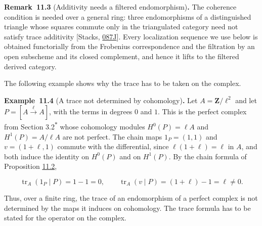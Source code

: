 \documentclass[11pt]{article}
\newenvironment{bpstatement}[2]{\par\addvspace{0.6\baselineskip}\noindent\textbf{#1}#2\textbf{.}\enspace\ignorespaces}
  {\par\addvspace{0.4\baselineskip}}
\newcommand{\bpout}[1]{#1\textsuperscript{\hyperlink{bp-outside}{\ensuremath{\ast}}}}
\begin{document}
\label{bp10}%
\begin{bpstatement}{Remark~11.3}{ (Additivity needs a filtered endomorphism)}
The coherence condition is needed over a general ring: three endomorphisms of a distinguished triangle whose squares commute only in the triangulated category need not satisfy trace additivity [Stacks, \href{https://stacks.math.columbia.edu/tag/087J}{087J}]. Every localization sequence we use below is obtained functorially from the Frobenius correspondence and the filtration by an open subscheme and its closed complement, and hence it lifts to the filtered derived category.
\end{bpstatement}

\label{bp11}%
The following example shows why the trace has to be taken on the complex.

\label{bp12}%
\begin{bpstatement}{Example~11.4}{ (A trace not determined by cohomology)}
Let \(A=\mathbf Z/\ell^2\) and let \(P=[A\xrightarrow{\ell}A]\), with the terms in degrees \(0\) and \(1\). This is the perfect complex from Section \bpout{3.2} whose cohomology modules \(H^0(P)=\ell A\) and \(H^1(P)=A/\ell A\) are not perfect. The chain maps \(1_P=(1,1)\) and \(v=(1+\ell,1)\) commute with the differential, since \(\ell(1+\ell)=\ell\) in \(A\), and both induce the identity on \(H^0(P)\) and on \(H^1(P)\). By the chain formula of Proposition \hyperref[bp7]{11.2},

\[
\operatorname{tr}_A(1_P\mid P)=1-1=0,
\qquad
\operatorname{tr}_A(v\mid P)=(1+\ell)-1=\ell\neq0.
\]

Thus, over a finite ring, the trace of an endomorphism of a perfect complex is not determined by the maps it induces on cohomology. The trace formula has to be stated for the operator on the complex.
\end{bpstatement}


\end{document}
